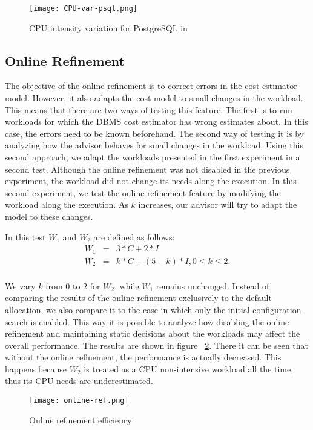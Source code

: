 \begin{figure}[ht]
 \centering
 \texttt{[image: CPU-var-psql.png]}
 \caption{CPU intensity variation for PostgreSQL in \cite{Soror:2008:AVM:1376616.1376711}}
 \label{fig:cpuvar-psql}
\end{figure} 

\subsection{Online Refinement}

The objective of the online refinement is to correct errors in the cost estimator model. However, it also adapts the cost model to small changes in the workload. This means that there are two ways of testing this feature. The first is to run workloads for which the DBMS cost estimator has wrong estimates about. In this case, the errors need to be known beforehand. The second way of testing it is by analyzing how the advisor behaves for small changes in the workload. Using this second approach, we adapt the workloads presented in the first experiment in a second test. Although the online refinement was not disabled in the previous experiment, the workload did not change its needs along the execution. In this second experiment, we test the online refinement feature by modifying the workload along the execution. As $k$ increases, our advisor will try to adapt the model to these changes.

In this test $W_{1}$ and $W_{2}$ are defined as follows:
\begin{eqnarray*}
 W_{1} &=& 3*C + 2*I \\
 W_{2} &=& k*C + (5-k)*I, 0 \leq k \leq 2. \\
\end{eqnarray*}

We vary $k$ from $0$ to $2$ for $W_{2}$, while $W_{1}$ remains unchanged. Instead of comparing the results of the online refinement exclusively to the default allocation, we also compare it to the case in which only the initial configuration search is enabled. This way it is possible to analyze how disabling the online refinement and maintaining static decisions about the workloads may affect the overall performance. The results are shown in figure ~\ref{fig:online-ref-pf}. There it can be seen that without the online refinement, the performance is actually decreased. This happens because $W_{2}$ is treated as a CPU non-intensive workload all the time, thus its CPU needs are underestimated.
\begin{figure}[ht]
 \centering
 \texttt{[image: online-ref.png]}
 \caption{Online refinement efficiency}
 \label{fig:online-ref-pf}
\end{figure} 

